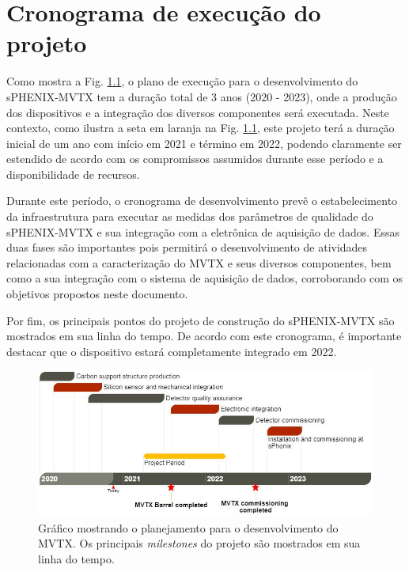 \chapter{Cronograma de execução do projeto}

Como mostra a Fig. \ref{cronograma}, o plano de execução para o desenvolvimento do sPHENIX-MVTX tem a duração total de 3 anos (2020 - 2023), onde a produção dos dispositivos e a integração dos diversos componentes será executada. Neste contexto, como ilustra a seta em laranja na Fig. \ref{cronograma}, este projeto terá a duração inicial de um ano com início em 2021 e término em 2022, podendo claramente ser estendido de acordo com os compromissos assumidos durante esse período e a disponibilidade de recursos.

Durante este período, o cronograma de desenvolvimento prevê o estabelecimento da infraestrutura para executar as medidas dos parâmetros de qualidade do sPHENIX-MVTX e sua integração com a eletrônica de aquisição de dados. Essas duas fases são importantes pois permitirá o desenvolvimento de atividades relacionadas com a caracterização do MVTX e seus diversos componentes, bem como a sua integração com o sistema de aquisição de dados, corroborando com os objetivos propostos neste documento. 

Por fim, os principais pontos do projeto de construção do sPHENIX-MVTX são mostrados em sua linha do tempo. De acordo com este cronograma, é importante destacar que o dispositivo estará completamente integrado em 2022.

\begin{figure}
    \centering
    \includegraphics[width=16.0cm]{assets/cronograma.JPG}
    \caption{Gráfico mostrando o planejamento para o desenvolvimento do MVTX. Os principais {\it milestones} do projeto são mostrados em sua linha do tempo.}
    \label{cronograma}
\end{figure}
